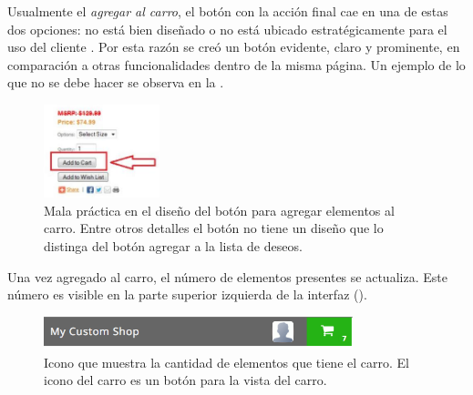 		Usualmente el \textit{agregar al carro}, el botón con la acción final \websiteINT \ecommerceCOM cae en una de estas dos opciones: no está bien diseñado o no está ubicado estratégicamente para el uso del cliente \cite{online_official_usabilitygeek_guidelines_usability}. Por esta razón se creó un botón evidente, claro y prominente, en comparación a otras funcionalidades dentro de la misma página. Un ejemplo de lo que no se debe hacer se observa en la .

		\begin{figure}[H]
			\centering
			\includegraphics[width=0.3\textwidth]{figuras/productos/examples/usabilitygeek_guidelines_wrong_ui_add_to_cart.png}
			\caption{Mala práctica en el diseño del botón para agregar elementos al carro. Entre otros detalles el botón no tiene un diseño que lo distinga del botón agregar a la lista de deseos.}
			\label{figure:apendice:productos:example:usabilitygeek_guidelines_wrong_ui_add_to_cart}
		\end{figure}

		Una vez agregado al carro, el número de elementos presentes se actualiza. Este número es visible en la parte superior izquierda de la interfaz ().

		\begin{figure}[H]
			\centering
			\includegraphics[width=0.8\textwidth]{figuras/solution/cart/header.png}
			\caption{Icono que muestra la cantidad de elementos que tiene el carro. El icono del carro es un botón para la vista del carro.}
			\label{figure:solution:cart:header}
		\end{figure}

